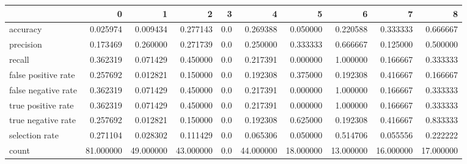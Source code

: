 \begin{tabular}{lrrrrrrrrr}
\toprule
{} &          0 &          1 &          2 &    3 &          4 &          5 &          6 &          7 &          8 \\
\midrule
accuracy            &   0.025974 &   0.009434 &   0.277143 &  0.0 &   0.269388 &   0.050000 &   0.220588 &   0.333333 &   0.666667 \\
precision           &   0.173469 &   0.260000 &   0.271739 &  0.0 &   0.250000 &   0.333333 &   0.666667 &   0.125000 &   0.500000 \\
recall              &   0.362319 &   0.071429 &   0.450000 &  0.0 &   0.217391 &   0.000000 &   1.000000 &   0.166667 &   0.333333 \\
false positive rate &   0.257692 &   0.012821 &   0.150000 &  0.0 &   0.192308 &   0.375000 &   0.192308 &   0.416667 &   0.166667 \\
false negative rate &   0.362319 &   0.071429 &   0.450000 &  0.0 &   0.217391 &   0.000000 &   1.000000 &   0.166667 &   0.333333 \\
true positive rate  &   0.362319 &   0.071429 &   0.450000 &  0.0 &   0.217391 &   0.000000 &   1.000000 &   0.166667 &   0.333333 \\
true negative rate  &   0.257692 &   0.012821 &   0.150000 &  0.0 &   0.192308 &   0.625000 &   0.192308 &   0.416667 &   0.833333 \\
selection rate      &   0.271104 &   0.028302 &   0.111429 &  0.0 &   0.065306 &   0.050000 &   0.514706 &   0.055556 &   0.222222 \\
count               &  81.000000 &  49.000000 &  43.000000 &  0.0 &  44.000000 &  18.000000 &  13.000000 &  16.000000 &  17.000000 \\
\bottomrule
\end{tabular}
